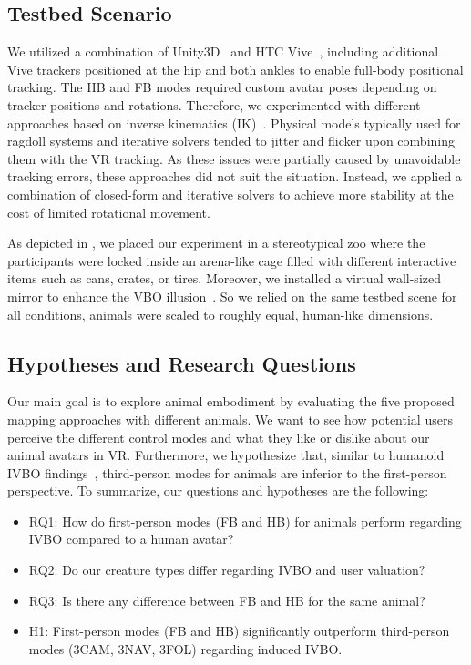 \subsection{Testbed Scenario}

We utilized a combination of Unity3D~ and HTC Vive~, including additional Vive trackers positioned at the hip and both ankles to enable full-body positional tracking. The HB and FB modes required custom avatar poses depending on tracker positions and rotations. Therefore, we experimented with different approaches based on inverse kinematics (IK)~\cite{buss2004introduction}. Physical models typically used for ragdoll systems and iterative solvers tended to jitter and flicker upon combining them with the VR tracking. As these issues were partially caused by unavoidable tracking errors, these approaches did not suit the situation. Instead, we applied a combination of closed-form and iterative solvers to achieve more stability at the cost of limited rotational movement. 

As depicted in , we placed our experiment in a stereotypical zoo where the participants were locked inside an arena-like cage filled with different interactive items such as cans, crates, or tires. Moreover, we installed a virtual wall-sized mirror to enhance the VBO illusion~\cite{latoschik2016fakemi}. So we relied on the same testbed scene for all conditions, animals were scaled to roughly equal, human-like dimensions.




\subsection{Hypotheses and Research Questions}

Our main goal is to explore animal embodiment by evaluating the five proposed mapping approaches with different animals. We want to see how potential users perceive the different control modes and what they like or dislike about our animal avatars in VR. Furthermore, we hypothesize that, similar to humanoid IVBO findings~\cite{galvan2015characterizing}, third-person modes for animals are inferior to the first-person perspective. To summarize, our questions and hypotheses are the following:
\begin{itemize}
  \setlength{\itemsep}{2pt}
  \setlength{\parskip}{0pt}
  \setlength{\parsep}{0pt}
\item RQ1: How do first-person modes (FB and HB) for animals perform regarding IVBO compared to a human avatar?
\item RQ2: Do our creature types differ regarding IVBO and user valuation?
\item RQ3: Is there any difference between FB and HB for the same animal?
\item H1: First-person modes (FB and HB) significantly outperform third-person modes (3CAM, 3NAV, 3FOL) regarding induced IVBO.
\end{itemize}




